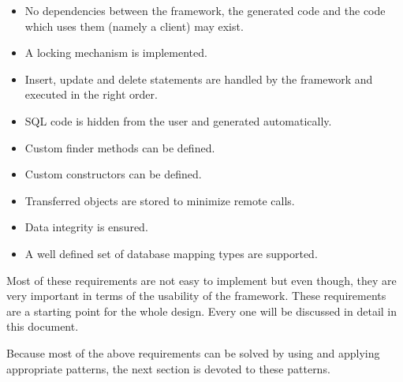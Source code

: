 		\begin{itemize}
			\item No dependencies between the framework, the generated code and the code which
						uses them (namely a client) may exist.
			\item A locking mechanism is implemented.
			\item Insert, update and delete statements are handled by the framework and
						executed in the right order.
			\item SQL code is hidden from the user and generated automatically.
			\item Custom finder methods can be defined.
			\item Custom constructors can be defined.
			\item Transferred objects are stored to minimize remote calls.
			\item Data integrity is ensured.
			\item A well defined set of database mapping types are supported.
		\end{itemize}
		
		Most of these requirements are not easy to implement but even though, they are very
		important in terms of the usability of the framework. These requirements are
		a starting point for the whole design. Every one will be discussed in detail
		in this document.
		
		Because most of the above requirements can be solved by using and applying 
		appropriate patterns, the next section is devoted to these patterns.